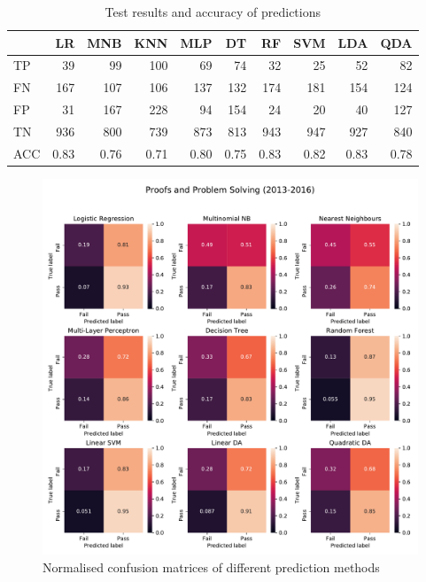 \documentclass[a4paper]{report}
\begin{document}
\begin{table}[H]
  \centering
  \begin{tabular}{lrrrrrrrrr}
    \toprule
    {} &   LR &  MNB &  KNN &  MLP &   DT &   RF &  SVM &  LDA &  QDA \\
    \midrule
    TP  &   39 &   99 &  100 &   69 &   74 &   32 &   25 &   52 &   82 \\
    FN  &  167 &  107 &  106 &  137 &  132 &  174 &  181 &  154 &  124 \\
    FP  &   31 &  167 &  228 &   94 &  154 &   24 &   20 &   40 &  127 \\
    TN  &  936 &  800 &  739 &  873 &  813 &  943 &  947 &  927 &  840 \\
    ACC & 0.83 & 0.76 & 0.71 & 0.80 & 0.75 & 0.83 & 0.82 & 0.83 & 0.78 \\
    \bottomrule
  \end{tabular}
  \caption{\label{tab:ML_CAP_bin_pre17}Test results and accuracy of predictions}
\end{table}

\begin{figure}[H]
  \centering
  \includegraphics[width=\linewidth]{fig/ML_PPS_bin_pre17.pdf}
  \caption{\label{fig:ML_PPS_bin_pre17}Normalised confusion matrices of different prediction methods}
\end{figure}
\end{document}
